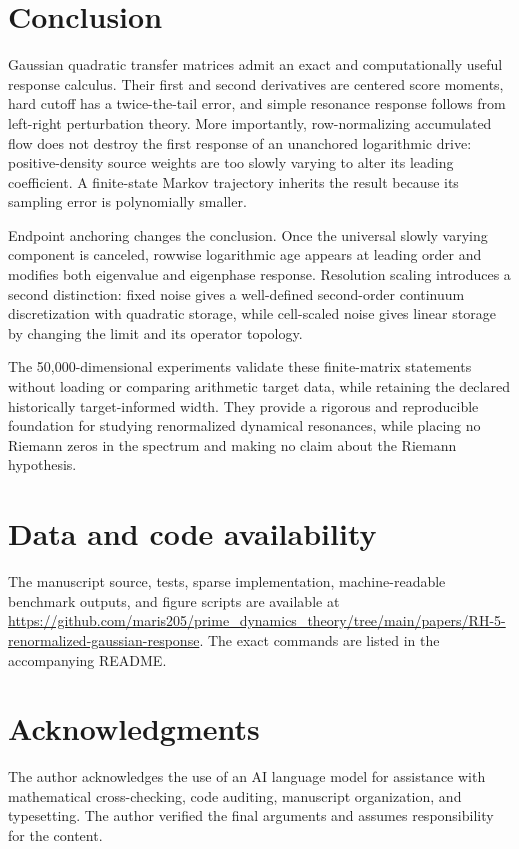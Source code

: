 \documentclass[11pt]{article}
\theoremstyle{definition}
\theoremstyle{remark}
\begin{document}
\section{Conclusion}

Gaussian quadratic transfer matrices admit an exact and computationally
useful response calculus.  Their first and second derivatives are centered
score moments, hard cutoff has a twice-the-tail error, and simple resonance
response follows from left-right perturbation theory.  More importantly,
row-normalizing accumulated flow does not destroy the first response of an
unanchored logarithmic drive: positive-density source weights are too slowly
varying to alter its leading coefficient.  A finite-state Markov trajectory
inherits the result because its sampling error is polynomially smaller.

Endpoint anchoring changes the conclusion.  Once the universal slowly
varying component is canceled, rowwise logarithmic age appears at leading
order and modifies both eigenvalue and eigenphase response.  Resolution
scaling introduces a second distinction: fixed noise gives a well-defined
second-order continuum discretization with quadratic storage, while
cell-scaled noise gives linear storage by changing the limit and its
operator topology.

The 50,000-dimensional experiments validate these finite-matrix statements
without loading or comparing arithmetic target data, while retaining the
declared historically target-informed width.  They provide a rigorous and
reproducible foundation for studying renormalized dynamical resonances, while
placing no Riemann zeros in the spectrum and making no claim about the
Riemann hypothesis.

\section*{Data and code availability}

The manuscript source, tests, sparse implementation, machine-readable
benchmark outputs, and figure scripts are available at
\url{https://github.com/maris205/prime_dynamics_theory/tree/main/papers/RH-5-renormalized-gaussian-response}.
The exact commands are listed in the accompanying README.

\section*{Acknowledgments}

The author acknowledges the use of an AI language model for assistance with
mathematical cross-checking, code auditing, manuscript organization, and
typesetting.  The author verified the final arguments and assumes
responsibility for the content.

{\small


}
\end{document}
